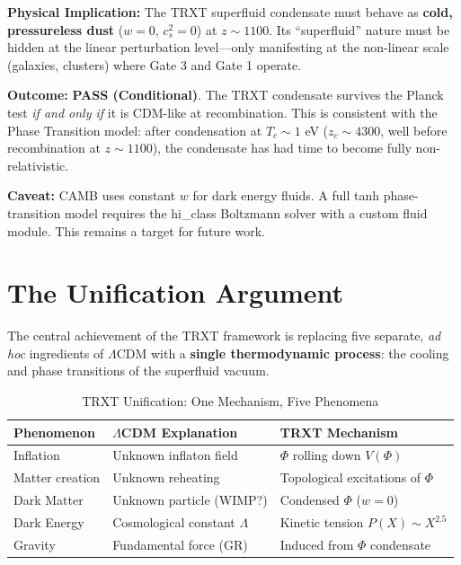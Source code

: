 \documentclass[a4paper,12pt]{article}
\begin{document}
\textbf{Physical Implication:} The TRXT superfluid condensate must behave as \textbf{cold, pressureless dust} ($w = 0$, $c_s^2 = 0$) at $z \sim 1100$. Its ``superfluid'' nature must be hidden at the linear perturbation level---only manifesting at the non-linear scale (galaxies, clusters) where Gate 3 and Gate 1 operate.

\textbf{Outcome:} \textbf{PASS (Conditional)}. The TRXT condensate survives the Planck test \textit{if and only if} it is CDM-like at recombination. This is consistent with the Phase Transition model: after condensation at $T_c \sim 1$ eV ($z_c \sim 4300$, well before recombination at $z \sim 1100$), the condensate has had time to become fully non-relativistic.

\textbf{Caveat:} CAMB uses constant $w$ for dark energy fluids. A full tanh phase-transition model requires the hi\_class Boltzmann solver with a custom fluid module. This remains a target for future work.

\section{The Unification Argument}

The central achievement of the TRXT framework is replacing five separate, \textit{ad hoc} ingredients of $\Lambda$CDM with a \textbf{single thermodynamic process}: the cooling and phase transitions of the superfluid vacuum.

\begin{table}[H]
\centering
\caption{TRXT Unification: One Mechanism, Five Phenomena}
\label{tab:unification}
\begin{tabular}{@{}lll@{}}
\toprule
\textbf{Phenomenon} & \textbf{$\Lambda$CDM Explanation} & \textbf{TRXT Mechanism} \\
\midrule
Inflation & Unknown inflaton field & $\Phi$ rolling down $V(\Phi)$ \\
Matter creation & Unknown reheating & Topological excitations of $\Phi$ \\
Dark Matter & Unknown particle (WIMP?) & Condensed $\Phi$ ($w=0$) \\
Dark Energy & Cosmological constant $\Lambda$ & Kinetic tension $P(X) \sim X^{2.5}$ \\
Gravity & Fundamental force (GR) & Induced from $\Phi$ condensate \\
\bottomrule
\end{tabular}
\end{table}
\end{document}
